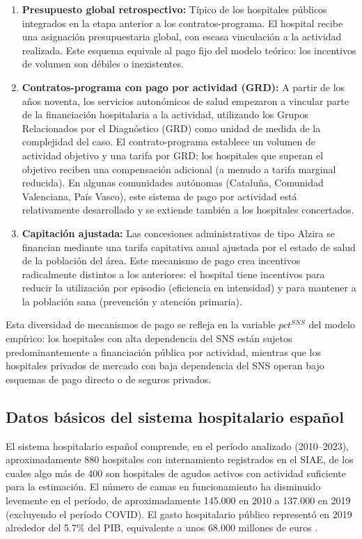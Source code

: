 \documentclass[12pt, a4paper, twoside, openright]{book}
\theoremstyle{plain}
\theoremstyle{definition}
\theoremstyle{remark}
\begin{document}
\begin{enumerate}[label=(\alph*)]
  \item \textbf{Presupuesto global retrospectivo:} Típico de los hospitales públicos integrados en la etapa anterior a los contratos-programa. El hospital recibe una asignación presupuestaria global, con escasa vinculación a la actividad realizada. Este esquema equivale al pago fijo del modelo teórico: los incentivos de volumen son débiles o inexistentes.

  \item \textbf{Contratos-programa con pago por actividad (GRD):} A partir de los años noventa, los servicios autonómicos de salud empezaron a vincular parte de la financiación hospitalaria a la actividad, utilizando los Grupos Relacionados por el Diagnóstico (GRD) como unidad de medida de la complejidad del caso. El contrato-programa establece un volumen de actividad objetivo y una tarifa por GRD; los hospitales que superan el objetivo reciben una compensación adicional (a menudo a tarifa marginal reducida). En algunas comunidades autónomas (Cataluña, Comunidad Valenciana, País Vasco), este sistema de pago por actividad está relativamente desarrollado y se extiende también a los hospitales concertados.

  \item \textbf{Capitación ajustada:} Las concesiones administrativas de tipo Alzira se financian mediante una tarifa capitativa anual ajustada por el estado de salud de la población del área. Este mecanismo de pago crea incentivos radicalmente distintos a los anteriores: el hospital tiene incentivos para reducir la utilización por episodio (eficiencia en intensidad) y para mantener a la población sana (prevención y atención primaria).
\end{enumerate}

Esta diversidad de mecanismos de pago se refleja en la variable $pct^{SNS}$ del modelo empírico: los hospitales con alta dependencia del SNS están sujetos predominantemente a financiación pública por actividad, mientras que los hospitales privados de mercado con baja dependencia del SNS operan bajo esquemas de pago directo o de seguros privados.

\subsection{Datos básicos del sistema hospitalario español}

El sistema hospitalario español comprende, en el período analizado (2010--2023), aproximadamente 880 hospitales con internamiento registrados en el SIAE, de los cuales algo más de 400 son hospitales de agudos activos con actividad suficiente para la estimación. El número de camas en funcionamiento ha disminuido levemente en el período, de aproximadamente 145.000 en 2010 a 137.000 en 2019 (excluyendo el período COVID). El gasto hospitalario público representó en 2019 alrededor del 5.7\% del PIB, equivalente a unos 68.000 millones de euros \citep{oecd2023}.
\end{document}
